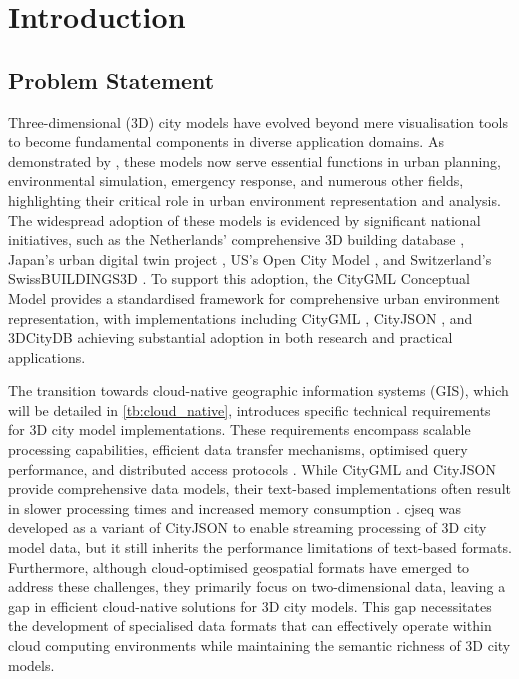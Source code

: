 
\chapter{Introduction}%
\label{introduction}

\section{Problem Statement}
\label{introduction:problem_statement}
Three-dimensional (3D) city models have evolved beyond mere visualisation tools to become fundamental components in diverse application domains.
As demonstrated by \citet{biljecki_2015}, these models now serve essential functions in urban planning, environmental simulation, emergency response, and numerous other fields, highlighting their critical role in urban environment representation and analysis.
The widespread adoption of these models is evidenced by significant national initiatives, such as the Netherlands' comprehensive 3D building database \citep{3dbag}, Japan's urban digital twin project \citep{plateau}, US's Open City Model \citep{us_buildings3d}, and Switzerland's SwissBUILDINGS3D \citep{swiss_buildings3d}.
To support this adoption, the CityGML Conceptual Model \citep{CityGML} provides a standardised framework for comprehensive urban environment representation, with implementations including CityGML \citep{CityGML}, CityJSON \citep{cityjson}, and 3DCityDB \citep{3dcitydb} achieving substantial adoption in both research and practical applications.


The transition towards cloud-native geographic information systems (GIS), which will be detailed in \autoref{tb:cloud_native}, introduces specific technical requirements for 3D city model implementations.
These requirements encompass scalable processing capabilities, efficient data transfer mechanisms, optimised query performance, and distributed access protocols \citep{cloud-optimised-formats}.
While CityGML and CityJSON provide comprehensive data models, their text-based implementations often result in slower processing times and increased memory consumption \citep{jordi_van_liempt_2020}.  \ac{cjseq} was developed as a variant of CityJSON to enable streaming processing of 3D city model data, but it still inherits the performance limitations of text-based formats.
Furthermore, although cloud-optimised geospatial formats have emerged to address these challenges, they primarily focus on two-dimensional data, leaving a gap in efficient cloud-native solutions for 3D city models.
This gap necessitates the development of specialised data formats that can effectively operate within cloud computing environments while maintaining the semantic richness of 3D city models.

